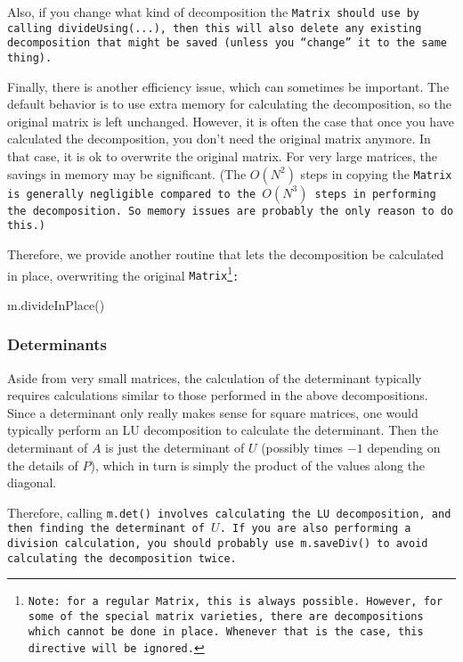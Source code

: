 Also, if you change what kind of decomposition the \tt{Matrix} should use by calling
\tt{divideUsing(...)}, then this will also delete any existing decomposition that 
might be saved (unless you ``change'' it to the same thing).

Finally, there is another efficiency issue, which can sometimes be important.  The default
behavior is to use extra memory for calculating the decomposition, so the original
matrix is left unchanged.  However, it is often the case that once you have 
calculated the decomposition, you don't need the original matrix anymore.
In that case, it is ok to overwrite the original matrix.  For very large matrices, 
the savings in memory may be significant.  (The $O(N^2)$ steps in copying 
the \tt{Matrix} is generally negligible compared to the $O(N^3)$ steps in performing
the decomposition.  So memory issues are probably the only reason to do this.)

Therefore, we provide another routine that lets the decomposition be 
calculated in place, overwriting the original \tt{Matrix}\footnote{
Note: for a regular \tt{Matrix}, this is always possible.  However, for some of the 
special matrix varieties, there are decompositions which cannot be done in place.
Whenever that is the case, this directive will be ignored.}:
\begin{tmvcode}
m.divideInPlace()
\end{tmvcode}

\subsubsection{Determinants}
\label{Matrix_Division_Determinants}

Aside from very small matrices, the calculation of the determinant typically 
requires calculations similar to those performed in
the above decompositions.  Since a determinant only really makes sense
for square matrices, one would typically perform an LU decomposition to calculate
the determinant.  Then the determinant of $A$ is just the determinant of $U$
(possibly times $-1$ depending on the details of $P$), which in turn is simply the 
product of the values along the diagonal.

Therefore, calling \tt{m.det()} involves calculating the LU decomposition, and then
finding the determinant of $U$.  
If you are also performing a division calculation, you should probably use
\tt{m.saveDiv()} to avoid calculating the decomposition twice.

